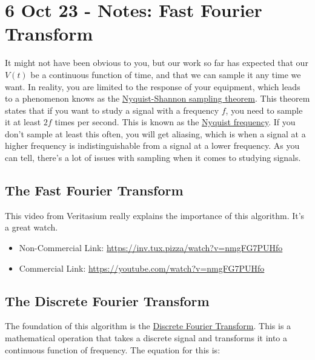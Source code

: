 \section{6 Oct 23 - Notes: Fast Fourier
Transform}\label{oct-23---notes-fast-fourier-transform}

It might not have been obvious to you, but our work so far has expected
that our \(V(t)\) be a continuous function of time, and that we can
sample it any time we want. In reality, you are limited to the response
of your equipment, which leads to a phenomenon knows as the
\href{https://en.wikipedia.org/wiki/Nyquist\%E2\%80\%93Shannon_sampling_theorem}{Nyquist-Shannon
sampling theorem}. This theorem states that if you want to study a
signal with a frequency \(f\), you need to sample it at least \(2f\)
times per second. This is known as the
\href{https://en.wikipedia.org/wiki/Nyquist_frequency}{Nyquist
frequency}. If you don't sample at least this often, you will get
aliasing, which is when a signal at a higher frequency is
indistinguishable from a signal at a lower frequency. As you can tell,
there's a lot of issues with sampling when it comes to studying signals.

\subsection{The Fast Fourier
Transform}\label{the-fast-fourier-transform}

This video from Veritasium really explains the importance of this
algorithm. It's a great watch.

\href{https://inv.tux.pizza/watch?v=nmgFG7PUHfo}{\pandocbounded{\texttt{[image: https://markdown-videos-api.jorgenkh.no/youtube/nmgFG7PUHfo?width=720\&height=405]}}}

\begin{itemize}
\tightlist
\item
  Non-Commercial Link: \url{https://inv.tux.pizza/watch?v=nmgFG7PUHfo}
\item
  Commercial Link: \url{https://youtube.com/watch?v=nmgFG7PUHfo}
\end{itemize}

\subsection{The Discrete Fourier
Transform}\label{the-discrete-fourier-transform}

The foundation of this algorithm is the
\href{https://en.wikipedia.org/wiki/Discrete_Fourier_transform}{Discrete
Fourier Transform}. This is a mathematical operation that takes a
discrete signal and transforms it into a continuous function of
frequency. The equation for this is:

